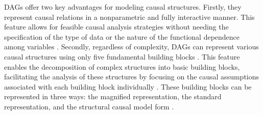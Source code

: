 \documentclass[
  authoryear,
  preprint,
  1p]{elsarticle}
\begin{document}
DAGs offer two key advantages for modeling causal structures. Firstly,
they represent causal relations in a nonparametric and fully interactive
manner. This feature allows for feasible causal analysis strategies
without needing the specification of the type of data or the nature of
the functional dependence among variables \citep{Morgan_et_al_2014}.
Secondly, regardless of complexity, DAGs can represent various causal
structures using only five fundamental building blocks
\citep{Neal_2020, McElreath_2020}. This feature enables the
decomposition of complex structures into basic building blocks,
facilitating the analysis of these structures by focusing on the causal
assumptions associated with each building block individually
\citep{McElreath_2020}. These building blocks can be represented in
three ways: the magnified representation, the standard representation,
and the structural causal model form \citep[SCM,][]{Morgan_et_al_2014}.

\newcommand{\dsep}{\perp\!\!\!\perp}
\newcommand{\ndsep}{\not\!\perp\!\!\!\perp}
\end{document}
